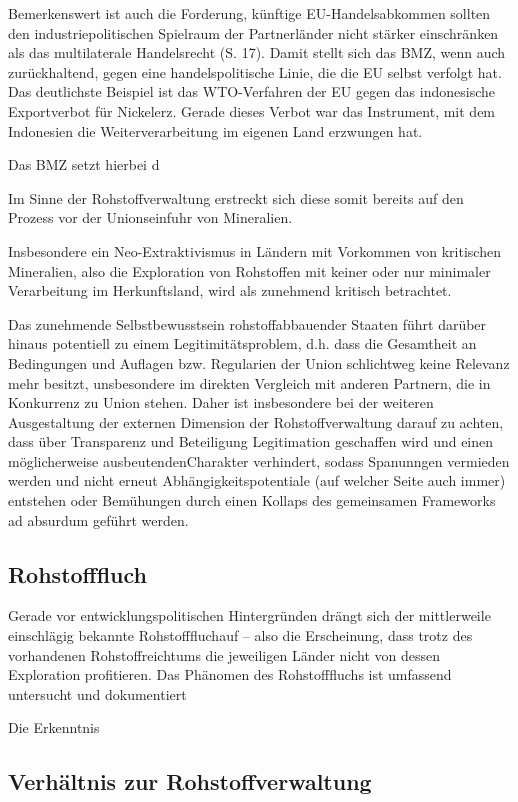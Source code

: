 \documentclass[12pt,a4paper,oneside]{book} %
\begin{document}
Bemerkenswert ist auch die Forderung, künftige EU-Handelsabkommen sollten den industriepolitischen Spielraum der Partnerländer nicht stärker einschränken als das multilaterale Handelsrecht (S. 17). Damit stellt sich das BMZ, wenn auch zurückhaltend, gegen eine handelspolitische Linie, die die EU selbst verfolgt hat. Das deutlichste Beispiel ist das WTO-Verfahren der EU gegen das indonesische Exportverbot für Nickelerz. Gerade dieses Verbot war das Instrument, mit dem Indonesien die Weiterverarbeitung im eigenen Land erzwungen hat.

Das BMZ setzt hierbei d

Im Sinne der Rohstoffverwaltung erstreckt sich diese somit bereits auf den Prozess vor der Unionseinfuhr von Mineralien.

Insbesondere ein Neo-Extraktivismus in Ländern mit Vorkommen von kritischen Mineralien, also die Exploration von Rohstoffen mit keiner oder nur minimaler Verarbeitung im Herkunftsland, wird als zunehmend kritisch betrachtet.

Das zunehmende Selbstbewusstsein rohstoffabbauender Staaten führt darüber hinaus potentiell zu einem Legitimitätsproblem, d.h. dass die Gesamtheit an Bedingungen und Auflagen bzw. Regularien der Union schlichtweg keine Relevanz mehr besitzt, unsbesondere im direkten Vergleich mit anderen Partnern, die in Konkurrenz zu Union stehen. Daher ist insbesondere bei der weiteren Ausgestaltung der externen Dimension der Rohstoffverwaltung darauf zu achten, dass über Transparenz und Beteiligung Legitimation geschaffen wird und einen möglicherweise \glqq ausbeutenden\grqq Charakter verhindert, sodass Spanunngen vermieden werden und nicht erneut Abhängigkeitspotentiale (auf welcher Seite auch immer) entstehen oder Bemühungen durch einen Kollaps des gemeinsamen Frameworks ad absurdum geführt werden.


\subsection{Rohstofffluch}

Gerade vor entwicklungspolitischen Hintergründen drängt sich der mittlerweile einschlägig bekannte \glqq Rohstofffluch\grqq auf -- also die Erscheinung, dass trotz des vorhandenen Rohstoffreichtums die jeweiligen Länder nicht von dessen Exploration profitieren. Das Phänomen des Rohstofffluchs ist umfassend untersucht und dokumentiert

Die Erkenntnis

\subsection{Verhältnis zur Rohstoffverwaltung}
\end{document}

